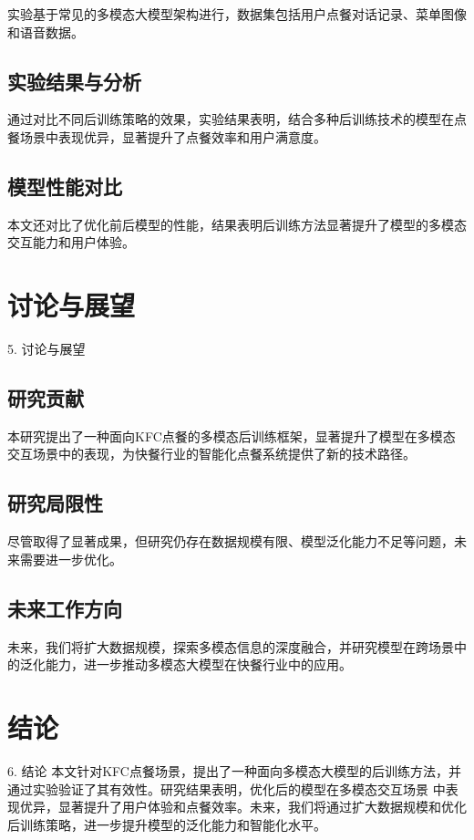 \documentclass{xdupgthesis}
\begin{document}
实验基于常见的多模态大模型架构进行，数据集包括用户点餐对话记录、菜单图像和语音数据。


\section{实验结果与分析}

通过对比不同后训练策略的效果，实验结果表明，结合多种后训练技术的模型在点餐场景中表现优异，显著提升了点餐效率和用户满意度。

\section{模型性能对比}

本文还对比了优化前后模型的性能，结果表明后训练方法显著提升了模型的多模态交互能力和用户体验。


\chapter{讨论与展望}
5. 讨论与展望

\section{研究贡献}

本研究提出了一种面向KFC点餐的多模态后训练框架，显著提升了模型在多模态交互场景中的表现，为快餐行业的智能化点餐系统提供了新的技术路径。

\section{研究局限性}

尽管取得了显著成果，但研究仍存在数据规模有限、模型泛化能力不足等问题，未来需要进一步优化。

\section{未来工作方向}

未来，我们将扩大数据规模，探索多模态信息的深度融合，并研究模型在跨场景中的泛化能力，进一步推动多模态大模型在快餐行业中的应用。

\chapter{结论}
6. 结论
本文针对KFC点餐场景，提出了一种面向多模态大模型的后训练方法，并通过实验验证了其有效性。研究结果表明，优化后的模型在多模态交互场景
中表现优异，显著提升了用户体验和点餐效率。未来，我们将通过扩大数据规模和优化后训练策略，进一步提升模型的泛化能力和智能化水平。
\end{document}
